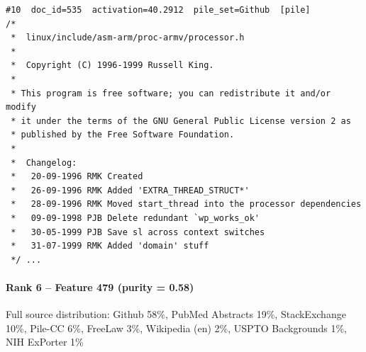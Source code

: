 \begin{verbatim}
#10  doc_id=535  activation=40.2912  pile_set=Github  [pile]
/*
 *  linux/include/asm-arm/proc-armv/processor.h
 *
 *  Copyright (C) 1996-1999 Russell King.
 *
 * This program is free software; you can redistribute it and/or modify
 * it under the terms of the GNU General Public License version 2 as
 * published by the Free Software Foundation.
 *
 *  Changelog:
 *   20-09-1996	RMK	Created
 *   26-09-1996	RMK	Added 'EXTRA_THREAD_STRUCT*'
 *   28-09-1996	RMK	Moved start_thread into the processor dependencies
 *   09-09-1998	PJB	Delete redundant `wp_works_ok'
 *   30-05-1999	PJB	Save sl across context switches
 *   31-07-1999	RMK	Added 'domain' stuff
 */ ...

\end{verbatim}

\paragraph*{Rank 6 -- Feature 479 (purity = 0.58)}

Full source distribution: Github 58\%, PubMed Abstracts 19\%, StackExchange 10\%, Pile-CC 6\%, FreeLaw 3\%, Wikipedia (en) 2\%, USPTO Backgrounds 1\%, NIH ExPorter 1\%

